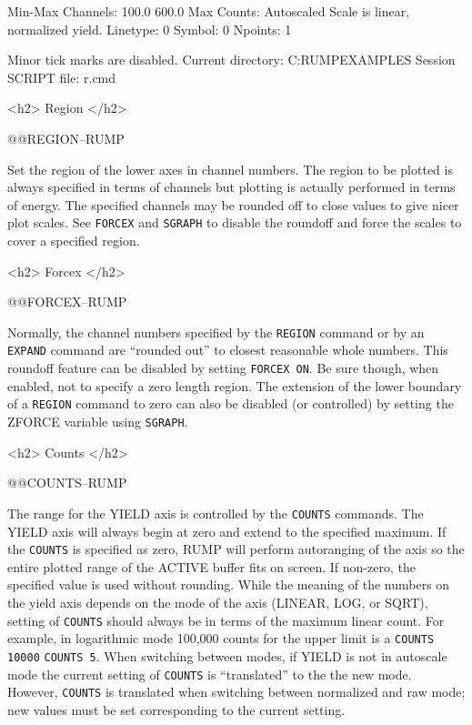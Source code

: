 {  Min-Max Channels:   100.0  600.0     Max Counts:  Autoscaled
  Scale is linear, normalized yield.
  Linetype:  0   Symbol:  0   Npoints:  1

 Minor tick marks are disabled.
 Current directory: C:{\bs}RUMP{\bs}EXAMPLES
 Session SCRIPT file: r.cmd
\endscreen

<h2> Region </h2>


@@{REGION--RUMP}

Set the region of the lower axes in channel numbers.  The region to be
plotted is always specified in terms of channels but plotting is actually
performed in terms of energy.  The specified channels may be rounded off to
close values to give nicer plot scales.  See {\tt FORCEX} and {\tt SGRAPH}
to disable the roundoff and force the scales to cover a specified region.


<h2> Forcex </h2>


@@{FORCEX--RUMP}

Normally, the channel numbers specified by the {\tt REGION} command or by
an {\tt EXPAND} command are ``rounded out'' to closest reasonable whole
numbers.  This roundoff feature can be disabled by setting {\tt FORCEX ON}.
Be sure though, when enabled, not to specify a zero length region.  The
extension of the lower boundary of a {\tt REGION} command to zero can also
be disabled (or controlled) by setting the ZFORCE variable using {\tt SGRAPH}.

<h2> Counts </h2>


@@{COUNTS--RUMP}

The range for the YIELD axis is controlled by the {\tt COUNTS} commands.  The
YIELD axis will always begin at zero and extend to the specified maximum.  If
the {\tt COUNTS} is specified as zero, RUMP will perform autoranging of the
axis so the entire plotted range of the ACTIVE buffer fits on screen.  If
non-zero, the specified value is used without rounding.  While the meaning of
the numbers on the yield axis depends on the mode of the axis (LINEAR, LOG, or
SQRT), setting of {\tt COUNTS} should always be in terms of the maximum linear
count.  For example, in logarithmic mode 100,000 counts for the upper limit is
a {\tt COUNTS 10000} {\bf} {\tt COUNTS 5}.  When switching between modes, if
YIELD is not in autoscale mode the current setting of {\tt COUNTS} is
``translated'' to the the new mode.  However, {\tt COUNTS} is translated when
switching between normalized and raw mode; new values must be set
corresponding to the current setting.

}
